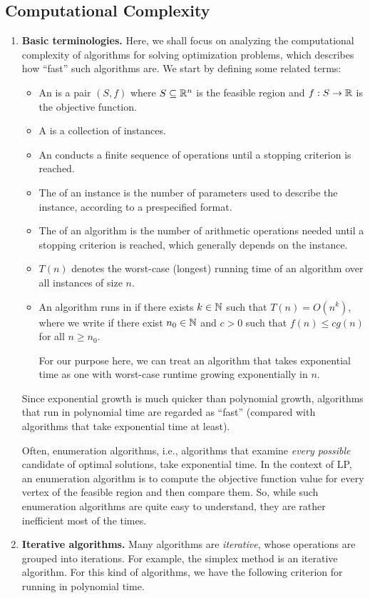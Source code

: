 \subsection{Computational Complexity}
\label{subsect:comp-complexity}
\begin{enumerate}
\item \textbf{Basic terminologies.} Here, we shall focus on analyzing the
computational complexity of algorithms for solving optimization problems, which
describes how ``fast'' such algorithms are. We start by defining some related
terms:
\begin{itemize}
\item An  is a pair \((S,f)\) where
\(S\subseteq \mathbb{R}^n\) is the feasible region and \(f:S\to\mathbb{R}\) is the objective function.
\item A  is a collection of instances.
\item An  conducts a finite sequence of operations until a
stopping criterion  is reached.
\item The  of an instance is the number of parameters used to
describe the instance, according to a prespecified format.
\item The  of an algorithm is the number of arithmetic
operations needed until a stopping criterion  is
reached, which generally depends on the instance.
\item \(T(n)\) denotes the worst-case (longest) running
time of an algorithm over all instances of size \(n\).
\item An algorithm runs in  if there exists \(k\in\mathbb{N}\)
such that \(T(n)=O(n^k)\), where we write  if there
exist \(n_0\in\mathbb{N}\) and \(c>0\) such that \(f(n)\le cg(n)\) for all \(n\ge
n_0\).

\begin{note}
For our purpose here, we can treat an algorithm that takes exponential time
as one with worst-case runtime growing exponentially in \(n\).
\end{note}
\end{itemize}
Since exponential growth is much quicker than polynomial growth, algorithms
that run in polynomial time are regarded as ``fast'' (compared with
algorithms that take exponential time at least).

Often, enumeration algorithms, i.e., algorithms that examine \emph{every
possible} candidate of optimal solutions, take exponential time.  In the
context of LP, an enumeration algorithm is to compute the objective function
value for every vertex of the feasible region and then compare them. So, while
such enumeration algorithms are quite easy to understand, they are rather
inefficient most of the times.
\item \label{it:iter-algo-poly-time} \textbf{Iterative algorithms.} Many
algorithms are \emph{iterative}, whose operations are grouped into iterations.
For example, the simplex method is an iterative algorithm. For this kind of
algorithms, we have the following criterion for running in polynomial time.


\end{enumerate}
